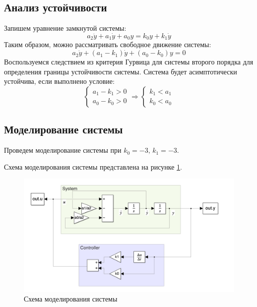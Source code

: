 \subsection{Анализ устойчивости}
Запишем уравнение замкнутой системы:
\begin{equation}
    a_2 \ddot{y} + a_1 \dot{y} + a_0 y = k_0y + k_1\dot{y}
\end{equation}
Таким образом, можно рассматривать свободное движение системы:
\begin{equation}
    a_2 \ddot{y} + (a_1 - k_1) \dot{y} + (a_0 - k_0) y = 0
\end{equation}
Воспользуемся следствием из критерия Гурвица для системы второго порядка для 
определения границы устойчивости системы. Система будет асимптотически устойчива, если выполнено условие:
\begin{equation}
    \begin{cases}
        a_1 - k_1 > 0 \\
        a_0 - k_0 > 0
    \end{cases} \Rightarrow
    \begin{cases}
        k_1 < a_1 \\
        k_0 < a_0
    \end{cases}
\end{equation}

\subsection{Моделирование системы} 
Проведем моделирование системы при $k_0 = -3,\, k_1 = -3$.

Схема моделирования системы представлена на рисунке \ref{fig:task1_scheme}.
\begin{figure}[ht!]
    \centering
    \includegraphics[width=\textwidth]{"media/scheme1.png"}
    \caption{Схема моделирования системы}
    \label{fig:task1_scheme}
\end{figure}


